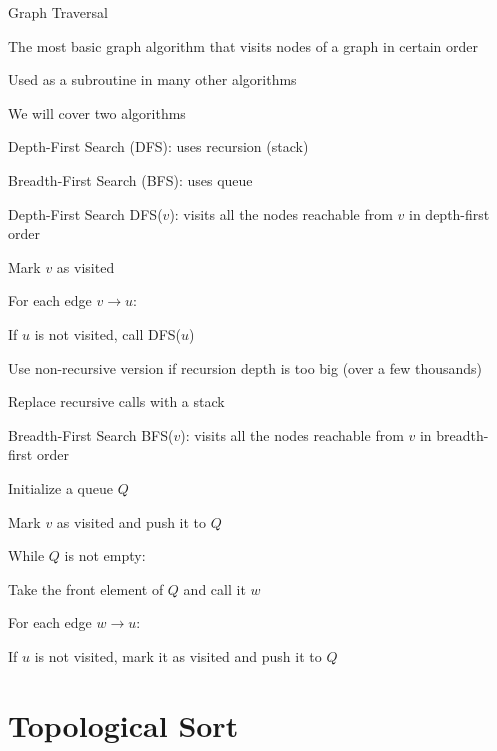 \documentclass[13pt,onlymath]{beamer}
\begin{document}
\begin{frame}{Graph Traversal}
\BIT
\item The most basic graph algorithm that visits nodes of a graph in certain order
\item Used as a subroutine in many other algorithms
\vfill
\item We will cover two algorithms
\BIT
\item Depth-First Search (DFS): uses recursion (stack)
\item Breadth-First Search (BFS): uses queue
\EIT
\EIT
\end{frame}

\begin{frame}{Depth-First Search}
DFS($v$): visits all the nodes reachable from $v$ in depth-first order
\BIT
\item Mark $v$ as visited
\item For each edge $v \rightarrow u$:
\BIT
\item If $u$ is not visited, call DFS($u$)
\EIT
\vfill
\item Use non-recursive version if recursion depth is too big (over a few thousands)
\BIT
\item Replace recursive calls with a stack
\EIT
\EIT
\end{frame}

\begin{frame}{Breadth-First Search}
BFS($v$): visits all the nodes reachable from $v$ in breadth-first order
\BIT
\item Initialize a queue $Q$
\item Mark $v$ as visited and push it to $Q$
\item While $Q$ is not empty:
\BIT
\item Take the front element of $Q$ and call it $w$
\item For each edge $w \rightarrow u$:
\BIT
\item If $u$ is not visited, mark it as visited and push it to $Q$
\EIT
\EIT
\EIT
\end{frame}


\section{Topological Sort}
\end{document}
